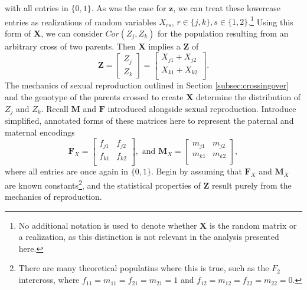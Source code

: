 \documentclass{article}
\newcommand{\ve}[1]{\mathbf{#1}}           %
\newcommand{\m}[1]{\mathbf{#1}}               %
\begin{document}
\noindent with all entries in $\{0,1\}$. As was the case for $\ve{z}$, we can treat these lowercase entries as realizations of random variables $X_{rs}$, $r \in \{j,k\}, s \in \{1,2\}$.\footnote{No additional notation is used to denote whether $\m{X}$ is the random matrix or a realization, as this distinction is not relevant in the analysis presented here.} Using this form of $\m{X}$, we can consider $Cor(Z_j, Z_k)$ for the population resulting from an arbitrary cross of two parents. Then $\m{X}$ implies a $\ve{Z}$ of
$$\ve{Z} = \begin{bmatrix} Z_j \\ Z_k \end{bmatrix} = \begin{bmatrix}
  X_{j1} + X_{j2} \\
  X_{k1} + X_{k2} \\
\end{bmatrix}.$$
The mechanics of sexual reproduction outlined in Section \ref{subsec:crossingover} and the genotype of the parents crossed to create $\m{X}$ determine the distribution of $Z_j$ and $Z_k$. Recall $\m{M}$ and $\m{F}$ introduced alongside sexual reproduction. Introduce simplified, annotated forms of these matrices here to represent the paternal and maternal encodings
$$\m{F}_X = \begin{bmatrix}
  f_{j1} & f_{j2} \\
  f_{k1} & f_{k2} \\
\end{bmatrix}, \text{ and }
\m{M}_X = \begin{bmatrix}
  m_{j1} & m_{j2} \\
  m_{k1} & m_{k2} \\
\end{bmatrix},$$
where all entries are once again in $\{0,1\}$. Begin by assuming that $\m{F}_X$ and $\m{M}_X$ are known constants\footnote{There are many theoretical populatins where this is true, such as the $F_2$ intercross, where $f_{11} = m_{11} = f_{21} = m_{21} = 1$ and $f_{12} = m_{12} = f_{22} = m_{22} = 0$.}, and the statistical properties of $\ve{Z}$ result purely from the mechanics of reproduction.
\end{document}
